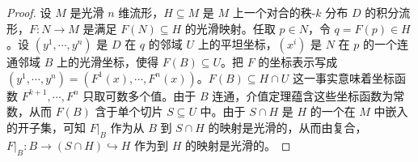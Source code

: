 \documentclass[../../main.tex]{subfiles}
\begin{document}
\begin{proof}
设 $M$ 是光滑 $n$ 维流形，$H\subseteq M$ 是 $M$ 上一个对合的秩-$k$ 分布 $D$ 的积分流形，$F\colon N\to M$ 是满足 $F(N)\subseteq H$ 的光滑映射。任取 $p\in N$，令 $q=F(p)\in H$。设 $(y^1,\cdots ,y^n)$ 是 $D$ 在 $q$ 的邻域 $U$ 上的平坦坐标，$(x^i)$ 是 $N$ 在 $p$ 的一个连通邻域 $B$ 上的光滑坐标，使得 $F(B)\subseteq U$。把 $F$ 的坐标表示写成 $(y^1,\cdots ,y^n)=(F^1(x),\cdots ,F^n(x))$。$F(B)\subseteq H\cap U$ 这一事实意味着坐标函数 $F^{k+1},\cdots ,F^n$ 只取可数多个值。由于 $B$ 连通，介值定理蕴含这些坐标函数为常数，从而 $F(B)$ 含于单个切片 $S\subseteq U$ 中。由于 $S\cap H$ 是 $H$ 的一个在 $M$ 中嵌入的开子集，可知 $F|_B$ 作为从 $B$ 到 $S\cap H$ 的映射是光滑的，从而由复合，$F|_B\colon B\to(S\cap H)\hookrightarrow H$ 作为到 $H$ 的映射是光滑的。
\end{proof}
\end{document}
